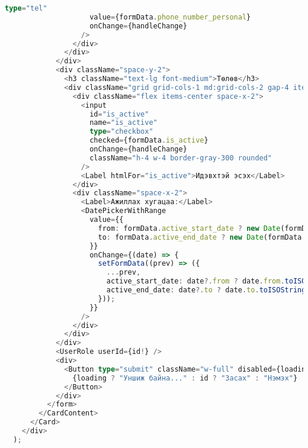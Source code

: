 \begin{lstlisting}[language=Typescript, caption=UI бүтэц, frame=single]
                    type="tel"
                    value={formData.phone_number_personal}
                    onChange={handleChange}
                  />
                </div>
              </div>
            </div>
            <div className="space-y-2">
              <h3 className="text-lg font-medium">Төлөв</h3>
              <div className="grid grid-cols-1 md:grid-cols-2 gap-4 items-center">
                <div className="flex items-center space-x-2">
                  <input
                    id="is_active"
                    name="is_active"
                    type="checkbox"
                    checked={formData.is_active}
                    onChange={handleChange}
                    className="h-4 w-4 border-gray-300 rounded"
                  />
                  <Label htmlFor="is_active">Идэвхтэй эсэх</Label>
                </div>
                <div className="space-x-2">
                  <Label>Ажиллах хугацаа:</Label>
                  <DatePickerWithRange
                    value={{
                      from: formData.active_start_date ? new Date(formData.active_start_date) : undefined,
                      to: formData.active_end_date ? new Date(formData.active_end_date) : undefined,
                    }}
                    onChange={(date) => {
                      setFormData((prev) => ({
                        ...prev,
                        active_start_date: date?.from ? date.from.toISOString(): "",
                        active_end_date: date?.to ? date.to.toISOString() : "",
                      }));
                    }}
                  />
                </div>
              </div>
            </div>
            <UserRole userId={id!} />
            <div>
              <Button type="submit" className="w-full" disabled={loading}>
                {loading ? "Уншиж байна..." : id ? "Засах" : "Нэмэх"}
              </Button>
            </div>
          </form>
        </CardContent>
      </Card>
    </div>
  );
\end{lstlisting}


